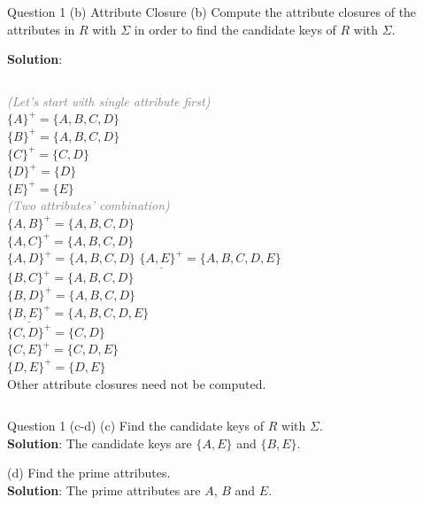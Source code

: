 \begin{frame}[fragile]{Question 1 (b) Attribute Closure}
(b) Compute the attribute closures of the attributes in $R$ with $\Sigma$ in order to find the candidate keys of $R$ with $\Sigma$. \vspace{15pt}

\textbf{Solution}: \vspace{5pt}

\begin{columns}[t]
	\textcolor{gray}{\scriptsize \textit{(Let's start with single attribute first)}}\\
	$\{A\}^{+}= \{A, B, C, D\}$\\	
	$\{B\}^{+}= \{A, B, C, D\}$\\	
	$\{C\}^{+}= \{C, D\}$\\
	$\{D\}^{+}= \{D\}$\\
	$\{E\}^{+}= \{E\}$\\ \vspace{5pt}
	\textcolor{gray}{\textit{\scriptsize (Two attributes' combination)}}\\
	$\{A, B\}^{+}= \{A, B, C, D\}$\\
	$\{A, C\}^{+}= \{A, B, C, D\}$\\
	$\{A, D\}^{+}= \{A, B, C, D\}$
	$\underline{\{A, E\}^{+}}= \{A, B, C, D, E\}$\\
	$\{B, C\}^{+}= \{A, B, C, D\}$\\
	$\{B, D\}^{+}= \{A, B, C, D\}$\\
	$\underline{\{B, E\}^{+}}= \{A, B, C, D, E\}$\\
	$\{C, D\}^{+}= \{C, D\}$\\
	$\{C, E\}^{+}= \{C, D, E\}$\\
	$\{D, E\}^{+}= \{D, E\}$\\ \vspace{5pt}
	Other attribute closures need not be computed.
\end{columns}
\end{frame}

\begin{frame}[fragile]{Question 1 (c-d)}
	(c) Find the candidate keys of $R$ with $\Sigma$. \\ \vspace{5pt}
	\textbf{Solution}: The candidate keys are $\{A, E\}$ and $\{B, E\}$. \\\vspace{35pt}

	(d) Find the prime attributes.\\ \vspace{5pt}
	\textbf{Solution}: The prime attributes are $A$, $B$ and $E$.
\end{frame}

